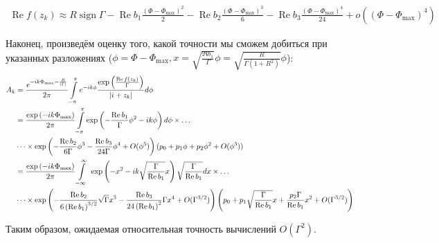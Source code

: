 \documentclass[a4paper, 12pt]{article}
\DeclareMathOperator*{\sign}{sign}
\DeclareMathOperator*{\Real}{Re}
\newenvironment{eqw}{\begin{equation} \begin{aligned}}   
    {\end{aligned}    \end{equation}}
\begin{document}
\begin{eqw}
    \Real f(z_k) \approx R\sign\Gamma - \Real b_1 \frac{\left(\Phi - \Phi_{\max}\right)^2}{2} - \Real b_2 \frac{\left(\Phi - \Phi_{\max}\right)^3}{6} - \Real b_3 \frac{\left(\Phi - \Phi_{\max}\right)^4}{24}+o\left(\left(\Phi - \Phi_{\max}\right)^4\right)
\end{eqw}

Наконец, произведём оценку того, какой точности мы сможем добиться при указанных разложениях ($\phi = \Phi - \Phi_{\max}, x=\sqrt{\frac{{\Re b_1}}{{\Gamma}}}\phi = \sqrt{\frac{R}{\Gamma\left(1+R^2\right)}}\phi$):
\begin{eqw}
     A_k &= \frac{e^{-ik\Phi_{\max}-\frac{R}{\abs{\Gamma}}}}{2\pi}\int\limits_{-\pi}^\pi e^{-ik\phi} 
     \frac{\exp\left(\frac{\Real f(z_k)}{\Gamma}\right)}{\abs{i+z_k}}d\phi \\
    &=\frac{\exp\left(-ik\Phi_{\max}\right)}{2\pi}\int\limits_{-\pi}^\pi
    \exp\left(-\frac{\Real b_1}{\Gamma}\phi^2 -ik\phi \right)d\phi\times\dots\\
    &\dots\times\exp\left(-\frac{\Real b_2}{6\Gamma}\phi^3 - \frac{\Real b_3}{24\Gamma}\phi^4 + O(\phi^5)\right)(p_0 + p_1\phi + p_2\phi^2 + O(\phi^3)) \\
    &= \frac{\exp\left(-ik\Phi_{\max}\right)}{2\pi}\int\limits_{-\infty}^{\infty}\
    \exp\left(-x^2 - ik\sqrt{\frac{\Gamma}{\Real b_1}}x\right) \sqrt{\frac{\Gamma}{\Real b_1}} dx\times\dots\\
    &\dots\times \exp\left(-\frac{\Real b_2}{6\left(\Real b_1\right)^{3/2}}\sqrt{\Gamma}x^3 - \frac{\Real b_3}{24\left(\Real b_1\right)^{2}}\Gamma x^4 + O(\Gamma^{3/2})\right)
    \left(p_0 + p_1\sqrt{\frac{\Gamma}{\Real b_1}}x +\frac{p_2\Gamma}{\Real b_1}x^2 + O(\Gamma^{3/2})\right)
\end{eqw}

Таким образом, ожидаемая относительная точность вычислений $O(\Gamma^{2})$.
\end{document}
